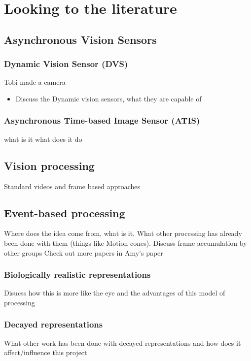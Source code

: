 \chapter{Looking to the literature}


\section{Asynchronous Vision Sensors}  %
\subsection{Dynamic Vision Sensor (DVS)}
Tobi made a camera \cite{tobidvs}
\begin{itemize}
    \item Discuss the Dynamic vision sensors, what they are capable of
\end{itemize}

\subsection{Asynchronous Time-based Image Sensor (ATIS)}
what is it what does it do

\pagebreak
\section{Vision processing}   %
Standard videos and frame based approaches

\pagebreak
\section{Event-based processing}     %
Where does the idea come from, what is it, 
What other processing has already been done with them (things like Motion cones).
Discuss frame accumulation by other groups
Check out more papers in Amy's paper

\subsection{Biologically realistic representations}
Disucss how this is more like the eye and the advantages of this model of processing

\pagebreak
\subsection{Decayed representations}  %
What other work has been done with decayed representations and how does it affect/influence this project

